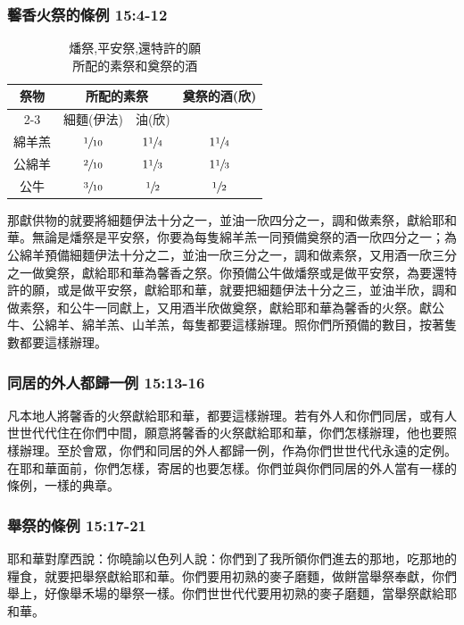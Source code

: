 \subsubsection{馨香火祭的條例 15:4-12}
\begin{table}
\vspace*{-3mm}
\centering
\begin{tabular}{|c|c|c|c|}
\hline
\hline
\multirow{2}{3em}{祭物} &\multicolumn{2}{c|}{所配的素祭}&\multirow{2}{3em}{奠祭的酒(欣)} \\\cline{2-3}
  & 細麵(伊法)        &油(欣)              &\\ \hline
綿羊羔   &$\sfrac{1}{10}$ &$1\sfrac{1}{4}$&$1\sfrac{1}{4}$\\\hline
公綿羊   &$\sfrac{2}{10}$  &$1\sfrac{1}{3}$ &$1\sfrac{1}{3}$\\\hline
公牛      &$\sfrac{3}{10}$ &$\sfrac{1}{2}$    &$\sfrac{1}{2}$\\\hline
\end{tabular}
\caption{燔祭,平安祭,還特許的願\\所配的素祭和奠祭的酒}
\end{table}
那獻供物的就要將細麵伊法十分之一，並油一欣四分之一，調和做素祭，獻給耶和華。無論是燔祭是平安祭，你要為每隻綿羊羔一同預備奠祭的酒一欣四分之一；為公綿羊預備細麵伊法十分之二，並油一欣三分之一，調和做素祭，又用酒一欣三分之一做奠祭，獻給耶和華為馨香之祭。你預備公牛做燔祭或是做平安祭，為要還特許的願，或是做平安祭，獻給耶和華，就要把細麵伊法十分之三，並油半欣，調和做素祭，和公牛一同獻上，又用酒半欣做奠祭，獻給耶和華為馨香的火祭。獻公牛、公綿羊、綿羊羔、山羊羔，每隻都要這樣辦理。照你們所預備的數目，按著隻數都要這樣辦理。

\subsubsection{同居的外人都歸一例 15:13-16}
凡本地人將馨香的火祭獻給耶和華，都要這樣辦理。若有外人和你們同居，或有人世世代代住在你們中間，願意將馨香的火祭獻給耶和華，你們怎樣辦理，他也要照樣辦理。至於會眾，你們和同居的外人都歸一例，作為你們世世代代永遠的定例。在耶和華面前，你們怎樣，寄居的也要怎樣。你們並與你們同居的外人當有一樣的條例，一樣的典章。

\subsubsection{舉祭的條例 15:17-21}
耶和華對摩西說：你曉諭以色列人說：你們到了我所領你們進去的那地，吃那地的糧食，就要把舉祭獻給耶和華。你們要用初熟的麥子磨麵，做餅當舉祭奉獻，你們舉上，好像舉禾場的舉祭一樣。你們世世代代要用初熟的麥子磨麵，當舉祭獻給耶和華。

